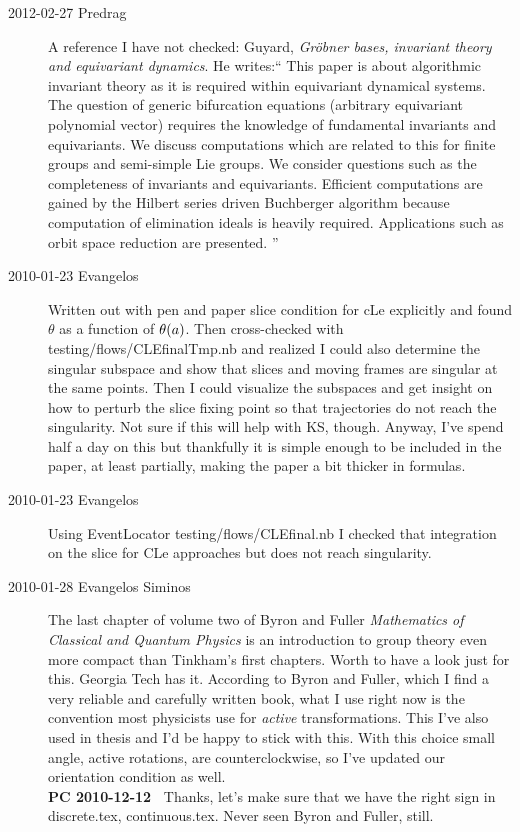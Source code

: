 \begin{description}
\item[2012-02-27 Predrag]
A reference I have not checked: Guyard,
\emph{Gr\"obner bases, invariant theory and equivariant dynamics}. He writes:``
This paper is about algorithmic invariant theory as it is required within
equivariant dynamical systems. The question of generic bifurcation
equations (arbitrary equivariant polynomial vector) requires the
knowledge of fundamental invariants and equivariants. We discuss
computations which are related to this for finite groups and semi-simple
Lie groups. We consider questions such as the completeness of invariants
and equivariants. Efficient computations are gained by the Hilbert series
driven Buchberger algorithm because computation of elimination ideals is
heavily required. Applications such as orbit space reduction are
presented.
''

\item[2010-01-23 Evangelos]
Written out with pen and paper slice condition for cLe
explicitly and found $\theta$ as a function of
$\theta(a)$. Then cross-checked with
testing/flows/CLEfinalTmp.nb and realized I could also
determine the singular subspace and show that slices and
moving frames are singular at the same points. Then I could
visualize the subspaces and get insight on how to perturb the
slice fixing point so that trajectories do not reach the
singularity. Not sure if this will help with KS, though.
Anyway, I've spend half a day on this but thankfully it is
simple enough to be included in the paper, at least
partially, making the paper a bit thicker in formulas.


\item[2010-01-23 Evangelos]
Using EventLocator testing/flows/CLEfinal.nb I checked that
integration on the slice for CLe approaches but does not
reach singularity.

\item[2010-01-28 Evangelos Siminos]
The last chapter of volume two of Byron and Fuller
{\em Mathematics of Classical and Quantum
Physics}
is an introduction to
group theory even more compact than Tinkham's first chapters. Worth to
have a look just for this. Georgia Tech has it.
According
to Byron and Fuller, which I find a very reliable and carefully written
book, what I use right now is the convention most physicists
use for \emph{active} transformations. This I've also used
in thesis and I'd be happy to stick with this. With this choice
small angle, active rotations, are counterclockwise, so I've updated
our orientation condition as well.
\\
{\bf PC 2010-12-12~} Thanks, let's make sure that we have the
right sign in discrete.tex, continuous.tex.
Never seen Byron and Fuller, still.


\end{description}
